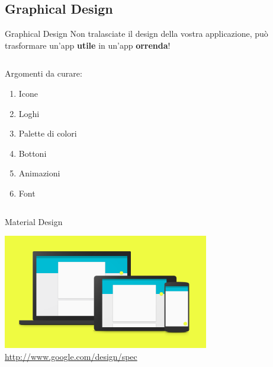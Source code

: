 \documentclass[xcolor=svgnames,11pt]{beamer}
\begin{document}
\subsection{Graphical Design}
\begin{frame}[fragile]{Graphical Design}
Non tralasciate il design della vostra applicazione, pu\`o trasformare un'app \textbf{utile} in un'app \textbf{orrenda}!

\pause
\medskip
\begin{columns}
    \begin{column}{0.3\textwidth}
Argomenti da curare:
\pause
\begin{enumerate}
\item Icone
\pause
\item Loghi
\pause
\item Palette di colori
\pause
\item Bottoni
\pause
\item Animazioni
\pause
\item Font
\end{enumerate}
\end{column}

\begin{column}{0.7\textwidth}
\begin{center}
\end{center}
\end{column}
\end{columns}
\end{frame}

\begin{frame}{Material Design}
\begin{center}
\includegraphics[width=9cm]{material.png}
\bigskip
 \\
\url{http://www.google.com/design/spec}
\end{center}
\end{frame}
\end{document}
